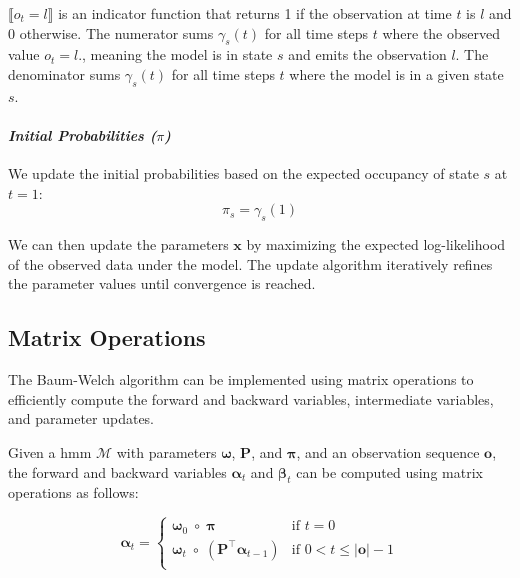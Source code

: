 $\lBrack o_t = l \rBrack$ is an indicator function that returns 1 if the observation at time $t$ is $l$ and 0 otherwise.
The numerator sums $\gamma_s(t)$ for all time steps $t$ where the observed value $o_t = l$., meaning the model is in state $s$ and emits the observation $l$.
The denominator sums $\gamma_s(t)$ for all time steps $t$ where the model is in a given state $s$.


\paragraph*{\textit{Initial Probabilities ($\pi$)}}

We update the initial probabilities based on the expected occupancy of state $s$ at $t = 1$:
\begin{equation}
    \pi_s = \gamma_s(1)
    \label{eq:initial-probabilities}
\end{equation}

We can then update the parameters $\mathbf{x}$ by maximizing the expected log-likelihood of the observed data under the model.
The update algorithm iteratively refines the parameter values until convergence is reached.

\subsection{Matrix Operations}\label{subsec:matrix-operations}
The Baum-Welch algorithm can be implemented using matrix operations to efficiently compute the forward and backward variables, intermediate variables, and parameter updates.

Given a \gls{hmm} $\mathcal{M}$ with parameters $\pmb{\omega}$, $\pmb{P}$, and $\pmb{\pi}$, and an observation sequence $\mathbf{o}$, the forward and backward variables $\pmb{\alpha}_t$ and $\pmb{\beta}_t$ can be computed using matrix operations as follows:

\begin{equation}
    \label{eq:alpha}
    \pmb{\alpha}_t =
    \begin{cases}
        \pmb{\omega}_0 \; \circ \; \pmb{\pi}   & \text{if } t = 0    \\
        \pmb{\omega}_t \; \circ \; \left( \pmb{P}^\top \pmb{\alpha}_{t - 1} \right)   & \text{if } 0 < t \leq |\mathbf{o}|-1 \\
    \end{cases}
\end{equation}


